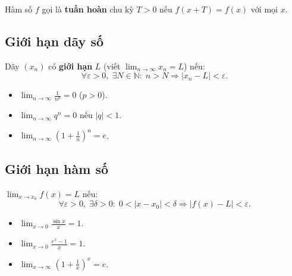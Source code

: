 \documentclass[12pt,a4paper]{article}
\begin{document}
\begin{dinhnghia}
  Hàm số $f$ gọi là \textbf{tuần hoàn} chu kỳ $T > 0$ nếu $f(x + T) = f(x)$ với mọi $x$.
\end{dinhnghia}

\subsection{Giới hạn dãy số}

\begin{dinhnghia}
  Dãy $(x_n)$ có \textbf{giới hạn} $L$ (viết $\lim_{n \to \infty} x_n = L$) nếu:
  \[
    \forall \varepsilon > 0,\; \exists N \in \mathbb{N}:\; n > N \Rightarrow |x_n - L| < \varepsilon.
  \]
\end{dinhnghia}

\begin{dinhly}[title={Giới hạn cơ bản}]
  \begin{itemize}
    \item $\displaystyle\lim_{n \to \infty} \frac{1}{n^p} = 0$ ($p > 0$).
    \item $\displaystyle\lim_{n \to \infty} q^n = 0$ nếu $|q| < 1$.
    \item $\displaystyle\lim_{n \to \infty} \left(1 + \frac{1}{n}\right)^n = e$.
  \end{itemize}
\end{dinhly}

\subsection{Giới hạn hàm số}

\begin{dinhnghia}
  $\displaystyle\lim_{x \to x_0} f(x) = L$ nếu:
  \[
    \forall \varepsilon > 0,\; \exists \delta > 0:\; 0 < |x - x_0| < \delta \Rightarrow |f(x) - L| < \varepsilon.
  \]
\end{dinhnghia}

\begin{congthuc}[title={Giới hạn quan trọng}]
  \begin{itemize}
    \item $\displaystyle\lim_{x \to 0} \frac{\sin x}{x} = 1$.
    \item $\displaystyle\lim_{x \to 0} \frac{e^x - 1}{x} = 1$.
    \item $\displaystyle\lim_{x \to \infty} \left(1 + \frac{1}{x}\right)^x = e$.
  \end{itemize}
\end{congthuc}
\end{document}

